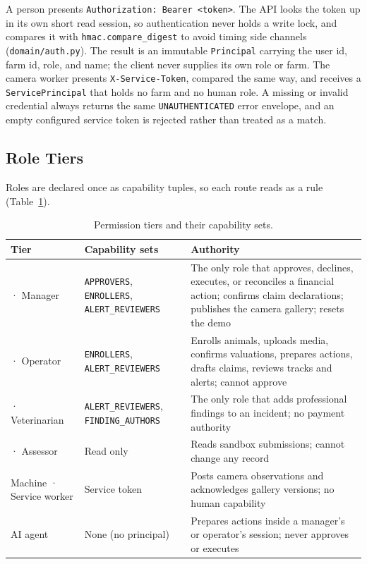\documentclass[11pt,letterpaper]{article}
\begin{document}
A person presents \texttt{Authorization: Bearer <token>}. The API looks the token up in its own short read session, so authentication never holds a write lock, and compares it with \texttt{hmac.compare\_digest} to avoid timing side channels (\texttt{domain/auth.py}). The result is an immutable \texttt{Principal} carrying the user id, farm id, role, and name; the client never supplies its own role or farm. The camera worker presents \texttt{X-Service-Token}, compared the same way, and receives a \texttt{ServicePrincipal} that holds no farm and no human role. A missing or invalid credential always returns the same \texttt{UNAUTHENTICATED} error envelope, and an empty configured service token is rejected rather than treated as a match.

\subsection{Role Tiers}

Roles are declared once as capability tuples, so each route reads as a rule (Table~\ref{tab:tiers}).

\begin{table}[H]
\centering
\caption{Permission tiers and their capability sets.}
\label{tab:tiers}
\small
\begin{tabularx}{\textwidth}{>{\raggedright\arraybackslash}p{2.6cm}>{\raggedright\arraybackslash}p{3.4cm}X}
\toprule
Tier & Capability sets & Authority \\
\midrule
1 · Manager & \texttt{APPROVERS}, \texttt{ENROLLERS}, \texttt{ALERT\_REVIEWERS} & The only role that approves, declines, executes, or reconciles a financial action; confirms claim declarations; publishes the camera gallery; resets the demo \\
2 · Operator & \texttt{ENROLLERS}, \texttt{ALERT\_REVIEWERS} & Enrolls animals, uploads media, confirms valuations, prepares actions, drafts claims, reviews tracks and alerts; cannot approve \\
3 · Veterinarian & \texttt{ALERT\_REVIEWERS}, \texttt{FINDING\_AUTHORS} & The only role that adds professional findings to an incident; no payment authority \\
4 · Assessor & Read only & Reads sandbox submissions; cannot change any record \\
Machine · Service worker & Service token & Posts camera observations and acknowledges gallery versions; no human capability \\
AI agent & None (no principal) & Prepares actions inside a manager's or operator's session; never approves or executes \\
\bottomrule
\end{tabularx}
\end{table}
\end{document}
